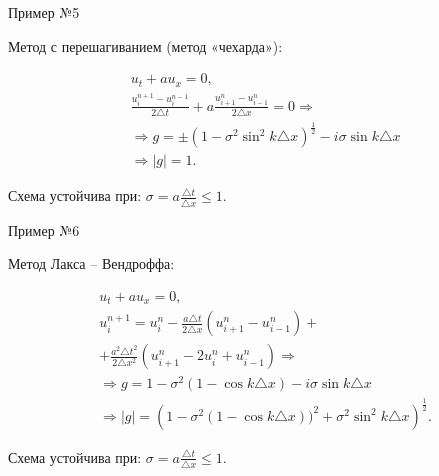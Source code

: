 \documentclass[10pt,xcolor=pst,aspectratio=169]{beamer}
\begin{document}
\begin{frame}{Пример №5}

	\transdissolve[duration=0.1]
	\justifying
	\large

	Метод с перешагиванием (метод «чехарда»):

	\[
		\begin{split}
			&u_{t} + a u_{x} = 0 , \\
			&\frac{u^{n + 1}_{i} - u^{n - 1}_{i}}{2 \triangle t} + a \frac{u^{n}_{i + 1} - u^{n}_{i - 1}}{2 \triangle x} = 0 \Rightarrow \\
			& \Rightarrow g = \pm (1 - \sigma^{2} \sin^{2} k \triangle x)^{\frac{1}{2}} - i \sigma \sin k \triangle x \\
			& \Rightarrow |g| = 1 .
		\end{split}
	\]

    Схема устойчива при: $\sigma = a \frac{\triangle t}{\triangle x} \leq 1$.\\

\end{frame}

\begin{frame}{Пример №6}

	\transdissolve[duration=0.1]
	\justifying
	\large

	Метод Лакса -- Вендроффа:

	\[
		\begin{split}
			&u_{t} + a u_{x} = 0 , \\
			&u^{n + 1}_{i} = u^{n}_{i} - \frac{a \triangle t}{2 \triangle x} (u^{n}_{i + 1} - u^{n}_{i - 1}) + \\
			& + \frac{a^{2} \triangle t^{2}}{2 \triangle x^{2}} (u^{n}_{i + 1} - 2 u^{n}_{i} + u^{n}_{i - 1}) \Rightarrow \\
			& \Rightarrow g = 1 - \sigma^{2} (1 - \cos k \triangle x) - i \sigma \sin k \triangle x \\
			& \Rightarrow |g| = \left( 1 - \sigma^{2} (1 - \cos k \triangle x))^2 + \sigma^{2} \sin^{2} k \triangle x \right)^{\frac{1}{2}} .
		\end{split}
	\]

    Схема устойчива при: $\sigma = a \frac{\triangle t}{\triangle x} \leq 1$.\\

\end{frame}
\end{document}
